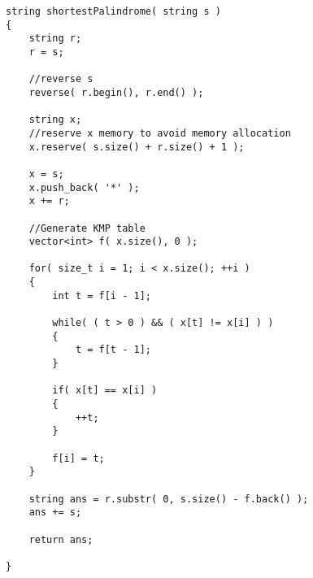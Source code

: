\begin{lstlisting}[style=customc, caption={KMP Table}]
string shortestPalindrome( string s )
{
    string r;
    r = s;

	//reverse s
    reverse( r.begin(), r.end() );

    string x;
    //reserve x memory to avoid memory allocation
    x.reserve( s.size() + r.size() + 1 );

    x = s;
    x.push_back( '*' );
    x += r;

	//Generate KMP table
    vector<int> f( x.size(), 0 );

    for( size_t i = 1; i < x.size(); ++i )
    {
        int t = f[i - 1];

        while( ( t > 0 ) && ( x[t] != x[i] ) )
        {
            t = f[t - 1];
        }

        if( x[t] == x[i] )
        {
            ++t;
        }

        f[i] = t;
    }

    string ans = r.substr( 0, s.size() - f.back() );
    ans += s;

    return ans;

}
\end{lstlisting}
